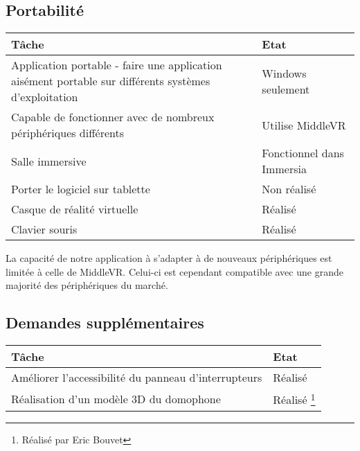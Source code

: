 \subsection{Portabilité}
\begin{tabular}{|p{}|p{}|}
	\hline
 	\textbf{Tâche} & \textbf{Etat} \\ \hline
	Application portable - faire une application aisément portable sur différents systèmes d'exploitation& Windows seulement \\ \hline
	Capable de fonctionner avec de nombreux périphériques différents & Utilise MiddleVR \\ \hline
	Salle immersive & Fonctionnel dans Immersia \\ \hline
	Porter le logiciel sur tablette  & Non réalisé \\ \hline
	Casque de réalité virtuelle & Réalisé \\ \hline
	Clavier souris & Réalisé \\ \hline
\end{tabular}


La capacité de notre application à s'adapter à de nouveaux périphériques est limitée à celle de MiddleVR. Celui-ci est cependant compatible avec une grande majorité des périphériques du marché.

\subsection{Demandes supplémentaires}
\begin{tabular}{|p{}|p{}|}
	\hline
	Tâche & Etat \\ \hline
	Améliorer l'accessibilité du panneau d'interrupteurs & Réalisé \\ \hline
	Réalisation d'un modèle 3D du domophone & Réalisé \footnote{\samepage Réalisé par Eric Bouvet } \\ \hline
\end{tabular}
